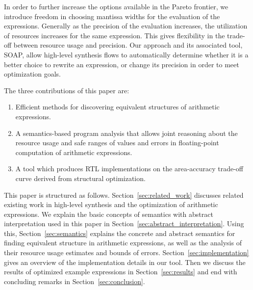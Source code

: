 In order to further increase the options available in the Pareto frontier,
we introduce freedom in choosing mantissa widths for the evaluation of the
expressions. Generally as the precision of the evaluation increases, the
utilization of resources increases for the same expression. This gives
flexibility in the trade-off between resource usage and precision. Our
approach and its associated tool, SOAP, allow high-level synthesis flows to
automatically determine whether it is a better choice to rewrite an expression,
or change its precision in order to meet optimization goals.

The three contributions of this paper are:
\begin{enumerate}
    \item Efficient methods for discovering equivalent structures of
    arithmetic expressions.
    \item A semantics-based program analysis that allows joint reasoning about
    the resource usage and safe ranges of values and errors in floating-point
    computation of arithmetic expressions.
    \item A tool which produces RTL implementations on the area-accuracy
    trade-off curve derived from structural optimization.
\end{enumerate}

This paper is structured as follows. Section~\ref{sec:related_work}
discusses related existing work in high-level synthesis and the
optimization of arithmetic expressions. We explain the basic
concepts of semantics with abstract interpretation used in this
paper in Section~\ref{sec:abstract_interpretation}. Using this,
Section~\ref{sec:semantics} explains the concrete and abstract semantics
for finding equivalent structure in arithmetic expressions, as well as
the analysis of their resource usage estimates and bounds of errors.
Section~\ref{sec:implementation} gives an overview of the implementation
details in our tool. Then we discuss the results of optimized example
expressions in Section~\ref{sec:results} and end with concluding remarks in
Section~\ref{sec:conclusion}.
